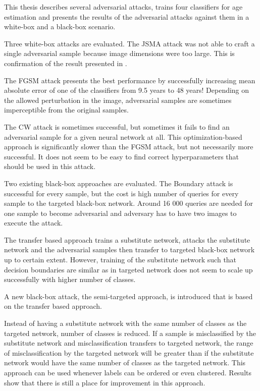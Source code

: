 This thesis describes several adversarial attacks, trains four classifiers for age estimation and presents the results of the adversarial attacks against them in a white-box and a black-box scenario.

Three white-box attacks are evaluated.
The JSMA attack was not able to craft a single adversarial sample because image dimensions were too large. This is confirmation of the result presented in \cite{DBLP:journals/corr/CarliniW16a}.

The FGSM attack presents the best performance by successfully increasing mean absolute error of one of the classifiers from 9.5 years to 48 years! Depending on the allowed perturbation in the image, adversarial samples are sometimes imperceptible from the original samples.

The CW attack is sometimes successful, but sometimes it fails to find an adversarial sample for a given neural network at all. This optimization-based approach is significantly slower than the FGSM attack, but not necessarily more successful. It does not seem to be easy to find correct hyperparameters that should be used in this attack.

Two existing black-box approaches are evaluated. 
The Boundary attack is successful for every sample, but the cost is high number of queries for every sample to the targeted black-box network. Around 16 000 queries are needed for one sample to become adversarial and adversary has to have two images to execute the attack. 

The transfer based approach trains a substitute network, attacks the substitute network and the adversarial samples then transfer to targeted black-box network up to certain extent. However, training of the substitute network such that decision boundaries are similar as in targeted network does not seem to scale up successfully with higher number of classes.

A new black-box attack, the semi-targeted approach, is introduced that is based on the transfer based approach. 

Instead of having a substitute network with the same number of classes as the targeted network, number of classes is reduced. If a sample is misclassified by the substitute network and misclassification transfers to targeted network, the range of misclassification by the targeted network will be greater than if the substitute network would have the same number of classes as the targeted network. This approach can be used whenever labels can be ordered or even clustered. Results show that there is still a place for improvement in this approach.


